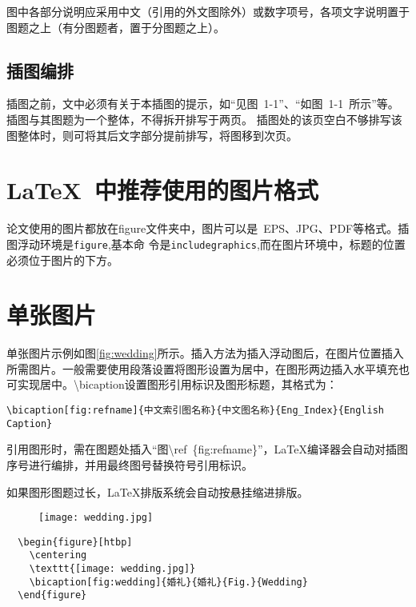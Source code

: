 图中各部分说明应采用中文（引用的外文图除外）或数字项号，各项文字说明置于图题之上（有分图题者，置于分图题之上）。

\subsection{插图编排}

插图之前，文中必须有关于本插图的提示，如“见图~1-1”、“如图~1-1~所示”等。插图与其图题为一个整体，不得拆开排写于两页。
插图处的该页空白不够排写该图整体时，则可将其后文字部分提前排写，将图移到次页。

\section{LaTeX~中推荐使用的图片格式}

论文使用的图片都放在figure文件夹中，图片可以是~EPS、JPG、PDF等格式。插图浮动环境是\texttt{figure},基本命
令是\texttt{includegraphics},而在图片环境中，标题的位置必须位于图片的下方。

\section{单张图片}

单张图片示例如图\ref{fig:wedding}所示。插入方法为插入浮动图后，在图片位置插入所需图片。一般需要使用段落设置将图形设置为居中，在图形两边插入水平填充也可实现居中。\textbackslash bicaption设置图形引用标识及图形标题，其格式为：

\begin{lstlisting}
\bicaption[fig:refname]{中文索引图名称}{中文图名称}{Eng_Index}{English Caption}
\end{lstlisting}

 引用图形时，需在图题处插入“图\textbackslash ref~\{fig:refname\}”，\LaTeX{}编译器会自动对插图序号进行编排，并用最终图号替换符号引用标识。

 如果图形图题过长，\LaTeX{}排版系统会自动按悬挂缩进排版。

\begin{figure}[htbp]
  \centering
  \texttt{[image: wedding.jpg]}
\end{figure}

\begin{lstlisting}
  \begin{figure}[htbp]
    \centering
    \texttt{[image: wedding.jpg]}
    \bicaption[fig:wedding]{婚礼}{婚礼}{Fig.}{Wedding}
  \end{figure}
\end{lstlisting}

